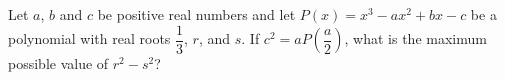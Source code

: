 Let $a$, $b$ and $c$ be positive real numbers and let $P(x)=x^3-ax^2+bx-c$ be a polynomial with real roots $\dfrac{1}{3}$, $r$, and $s$. If $c^2=aP\left(\dfrac{a}{2}\right)$, what is the maximum possible value of $r^2-s^2$?
